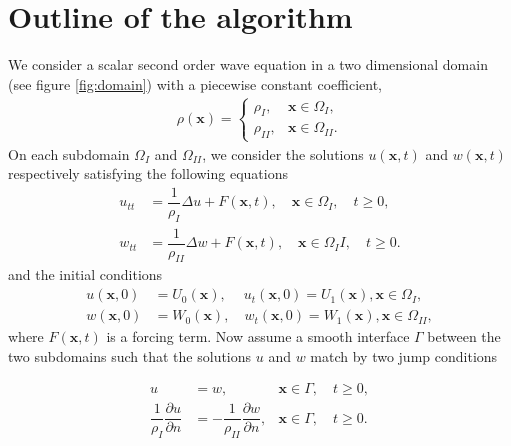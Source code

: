 \documentclass[10pt,a4paper,twoside, french]{article}
\numberwithin{equation}{section}
\numberwithin{figure}{section}
\numberwithin{table}{section}
\newcommand{\bx}{\mathbf{x}}
\begin{document}
\section{Outline of the algorithm}
We consider a scalar second order wave equation in a two dimensional domain (see figure \ref{fig:domain}) with a piecewise constant coefficient,
\begin{align*}
\rho(\bx)=\left\lbrace
\begin{array}{cc}
\rho_I, & \bx\in\Omega_I, \\
\rho_{II}, & \bx\in\Omega_{II}.
\end{array}
\right.
\end{align*}
On each subdomain $\Omega_I$ and $\Omega_{II}$, we consider the solutions $u(\bx,t)$ and $w(\bx,t)$ respectively satisfying the following equations
\begin{align}
u_{tt} &= \dfrac{1}{\rho_I}\Delta u+F(\bx,t), \quad \bx\in\Omega_I,\quad t\geq 0,\\
w_{tt} &= \dfrac{1}{\rho_{II}}\Delta w+F(\bx,t), \quad \bx\in\Omega_{I}I,\quad t\geq 0.
\end{align}
and the initial conditions
\begin{align}
u(\bx,0) &= U_0(\bx),\quad ~u_t(\bx,0)=U_1(\bx), \bx\in\Omega_I, \\
w(\bx,0) &= W_0(\bx),\quad w_t(\bx,0)=W_1(\bx), \bx\in\Omega_{II},
\end{align}
where $F(\bx,t)$ is a forcing term. Now assume a smooth interface $\Gamma$ between the two subdomains such that the solutions $u$ and $w$ match by two jump conditions
\begin{center}
\begin{minipage}[c]{.5\textwidth}
\begin{align}
u &= w, &\bx\in\Gamma, \quad t\geq 0, \label{eq:jump_1} \\
\dfrac{1}{\rho_I}\dfrac{\partial u}{\partial n} &= -\dfrac{1}{\rho_{II}}\dfrac{\partial w}{\partial n}, &\bx\in\Gamma, \quad t\geq 0.
\label{eq:jump_2}
\end{align}
\end{minipage}
\end{center}

\begin{center}
\vspace{.5cm}
\begin{minipage}[c]{0.5\textwidth}
\centering
{}
\end{minipage}
\label{fig:domain}
\end{center}
\end{document}
